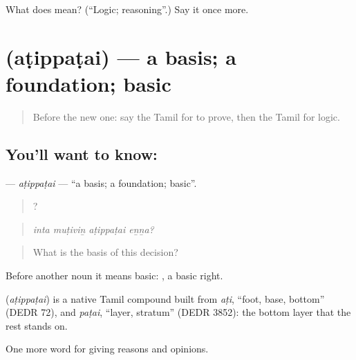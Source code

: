 \begin{tcolorbox}[breakable,colback=teal!4,colframe=teal!35!black,title={Before you move on}]
What does  mean? (\textquotedblleft{}Logic; reasoning\textquotedblright{}.) Say it once more.
\end{tcolorbox}
\section[\texorpdfstring{\ta{அடிப்படை} (aṭippaṭai)}{அடிப்படை (aṭippaṭai)}]{ (aṭippaṭai) — a basis; a foundation; basic}

\label{lesson:TA-C347-atippatai}



\begin{quote}
Before the new one: say the Tamil for to prove, then the Tamil for logic.
\end{quote}

\subsection*{You'll want to know: }
\textbf{} — \emph{aṭippaṭai} — \textquotedblleft{}a basis; a foundation; basic\textquotedblright{}.

\begin{quote}
   ?
\end{quote}

\begin{quote}
\emph{inta muṭiviṉ aṭippaṭai eṉṉa?}
\end{quote}

\begin{quote}
What is the basis of this decision?
\end{quote}

Before another noun it means basic:  , a basic right.

\begin{cousinweb}
\textbf{} (\emph{aṭippaṭai}) is a native Tamil compound built from \emph{aṭi}, \textquotedblleft{}foot, base, bottom\textquotedblright{} (DEDR 72), and \emph{paṭai}, \textquotedblleft{}layer, stratum\textquotedblright{} (DEDR 3852): the bottom layer that the rest stands on.
\end{cousinweb}

\begin{grammarlens}[title={What you've built}]
One more word for giving reasons and opinions.
\end{grammarlens}

